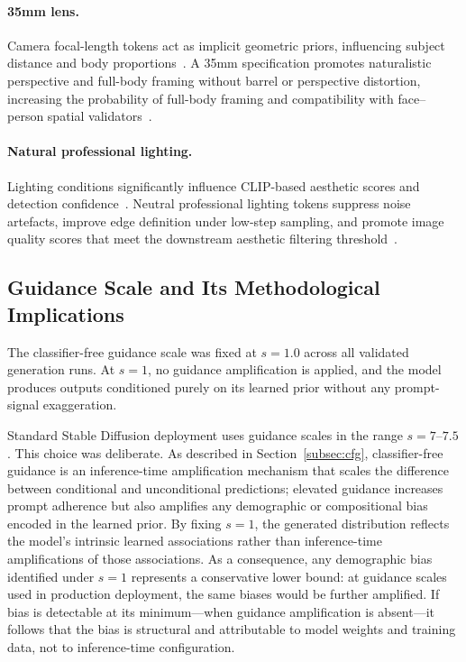 \paragraph{35mm lens.}
Camera focal-length tokens act as implicit geometric priors, influencing
subject distance and body proportions~\cite{Fang_2024_CameraTokens}.
A 35mm specification promotes naturalistic perspective and full-body
framing without barrel or perspective distortion, increasing the probability
of full-body framing and compatibility with face--person spatial
validators~\cite{Chen_2023_T2ICompBench}.

\paragraph{Natural professional lighting.}
Lighting conditions significantly influence CLIP-based aesthetic scores and
detection confidence~\cite{Schuhmann_2022_LaionAesthetics}. Neutral
professional lighting tokens suppress noise artefacts, improve edge
definition under low-step sampling, and promote image quality scores that
meet the downstream aesthetic filtering threshold~\cite{Friedrich_2023_FairDiffusionInstructingTextToImage}.

\subsection{Guidance Scale and Its Methodological Implications}

The classifier-free guidance scale was fixed at $s = 1.0$ across all
validated generation runs. At $s = 1$, no guidance amplification is
applied, and the model produces outputs conditioned purely on its learned
prior without any prompt-signal exaggeration.

Standard Stable Diffusion deployment uses guidance scales in the range
$s = 7$--$7.5$. This choice was deliberate. As described in
Section~\ref{subsec:cfg}, classifier-free guidance is an inference-time
amplification mechanism that scales the difference between conditional and
unconditional predictions; elevated guidance increases prompt adherence but
also amplifies any demographic or compositional bias encoded in the learned
prior. By fixing $s = 1$, the generated distribution reflects the model's
intrinsic learned associations rather than inference-time amplifications of
those associations. As a consequence, any demographic bias identified under
$s = 1$ represents a conservative lower bound: at guidance scales used in
production deployment, the same biases would be further amplified. If bias
is detectable at its minimum---when guidance amplification is absent---it
follows that the bias is structural and attributable to model weights and
training data, not to inference-time configuration.

